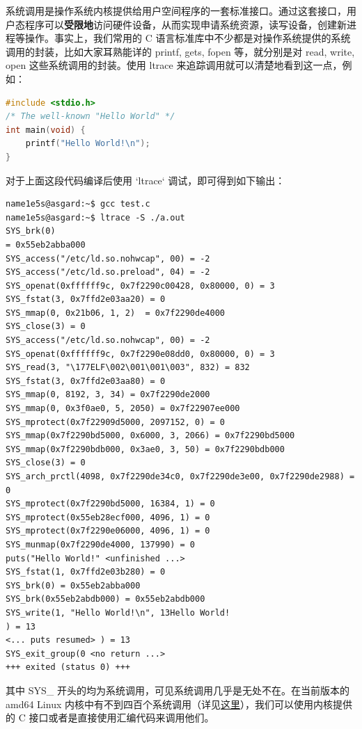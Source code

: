 \documentclass[blue,normal,cn]{elegantnote}
\begin{document}
系统调用是操作系统内核提供给用户空间程序的一套标准接口。通过这套接口，用户态程序可以\textbf{受限地}访问硬件设备，从而实现申请系统资源，读写设备，创建新进程等操作。事实上，我们常用的 C 语言标准库中不少都是对操作系统提供的系统调用的封装，比如大家耳熟能详的 printf, gets, fopen 等，就分别是对 read, write, open 这些系统调用的封装。使用 ltrace 来追踪调用就可以清楚地看到这一点，例如：
\begin{lstlisting}[language=C]
#include <stdio.h>
/* The well-known "Hello World" */
int main(void) {
	printf("Hello World!\n");
}
\end{lstlisting}
对于上面这段代码编译后使用 `ltrace` 调试，即可得到如下输出：
\begin{lstlisting}
name1e5s@asgard:~$ gcc test.c 
name1e5s@asgard:~$ ltrace -S ./a.out 
SYS_brk(0)                                                                                                           = 0x55eb2abba000
SYS_access("/etc/ld.so.nohwcap", 00) = -2
SYS_access("/etc/ld.so.preload", 04) = -2
SYS_openat(0xffffff9c, 0x7f2290c00428, 0x80000, 0) = 3
SYS_fstat(3, 0x7ffd2e03aa20) = 0
SYS_mmap(0, 0x21b06, 1, 2)  = 0x7f2290de4000
SYS_close(3) = 0
SYS_access("/etc/ld.so.nohwcap", 00) = -2
SYS_openat(0xffffff9c, 0x7f2290e08dd0, 0x80000, 0) = 3
SYS_read(3, "\177ELF\002\001\001\003", 832) = 832
SYS_fstat(3, 0x7ffd2e03aa80) = 0
SYS_mmap(0, 8192, 3, 34) = 0x7f2290de2000
SYS_mmap(0, 0x3f0ae0, 5, 2050) = 0x7f22907ee000
SYS_mprotect(0x7f22909d5000, 2097152, 0) = 0
SYS_mmap(0x7f2290bd5000, 0x6000, 3, 2066) = 0x7f2290bd5000
SYS_mmap(0x7f2290bdb000, 0x3ae0, 3, 50) = 0x7f2290bdb000
SYS_close(3) = 0
SYS_arch_prctl(4098, 0x7f2290de34c0, 0x7f2290de3e00, 0x7f2290de2988) = 0
SYS_mprotect(0x7f2290bd5000, 16384, 1) = 0
SYS_mprotect(0x55eb28ecf000, 4096, 1) = 0
SYS_mprotect(0x7f2290e06000, 4096, 1) = 0
SYS_munmap(0x7f2290de4000, 137990) = 0
puts("Hello World!" <unfinished ...>
SYS_fstat(1, 0x7ffd2e03b280) = 0
SYS_brk(0) = 0x55eb2abba000
SYS_brk(0x55eb2abdb000) = 0x55eb2abdb000
SYS_write(1, "Hello World!\n", 13Hello World!
) = 13
<... puts resumed> ) = 13
SYS_exit_group(0 <no return ...>
+++ exited (status 0) +++
\end{lstlisting}

其中 SYS\_ 开头的均为系统调用，可见系统调用几乎是无处不在。在当前版本的 amd64 Linux 内核中有不到四百个系统调用（详见\href{https://github.com/torvalds/linux/blob/master/arch/x86/entry/syscalls/syscall\_64.tbl}{这里}），我们可以使用内核提供的 C 接口或者是直接使用汇编代码来调用他们。
\end{document}
